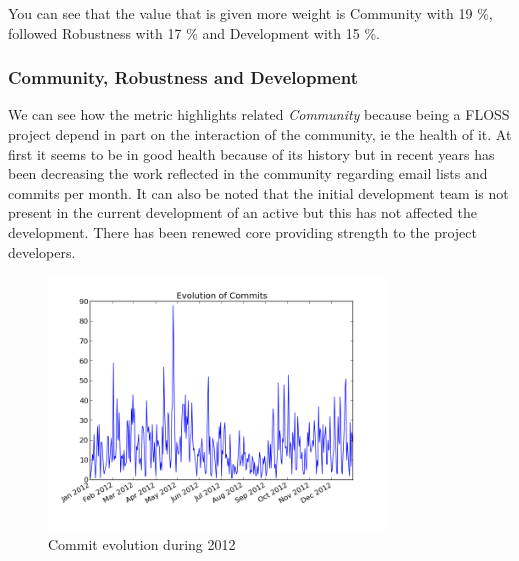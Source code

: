 \documentclass[11pt]{scrartcl}
\begin{document}
\par You can see that the value that is given more weight is Community with 19 \%, followed Robustness with 17 \% and Development with 15 \%. 

\subsubsection{Community, Robustness and Development}

\par We can see how the metric highlights related \emph{Community} because being a FLOSS project depend in part on the interaction of the community, ie the health of it. At first it seems to be in good health because of its history but in recent years has been decreasing the work reflected in the community regarding email lists and commits per month. It can also be noted that the initial development team is not present in the current development of an active but this has not affected the development. There has been renewed core providing strength to the project developers.

\begin{figure}
  \centering
    \includegraphics[width=0.8\textwidth]{libcsvanaly2/script_sample/basic_timeseries.png}
  \caption{Commit evolution during 2012}
  \label{fig:2012-monthy-commmits}
\end{figure}
\end{document}
